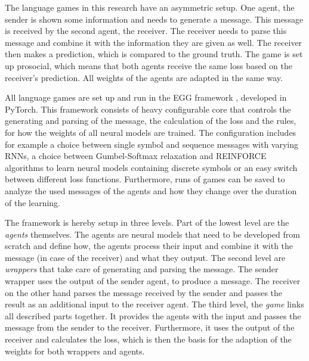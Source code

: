 The language games in this research have an asymmetric setup.
One agent, the sender is shown some information and needs to generate a message.
This message is received by the second agent, the receiver.
The receiver needs to parse this message and combine it with the information they are given as well.
The receiver then makes a prediction, which is compared to the ground truth.
The game is set up prosocial, which means that both agents receive the same loss based on the receiver's prediction.
All weights of the agents are adapted in the same way.

All language games are set up and run in the EGG framework \citep{Kharitonov2019}, developed in PyTorch.
This framework consists of heavy configurable core that controls the generating and parsing of the message, the calculation of the loss and the rules, for how the weights of all neural models are trained.
The configuration includes for example a choice between single symbol and sequence messages with varying RNNs, a choice between Gumbel-Softmax relaxation and REINFORCE algorithms to learn neural models containing discrete symbols or an easy switch between different loss functions.
Furthermore, runs of games can be saved to analyze the used messages of the agents and how they change over the duration of the learning.

The framework is hereby setup in three levels.
Part of the lowest level are the \emph{agents} themselves.
The agents are neural models that need to be developed from scratch and define how, the agents process their input and combine it with the message (in case of the receiver) and what they output.
The second level are \emph{wrappers} that take care of generating and parsing the message.
The sender wrapper uses the output of the sender agent, to produce a message.
The receiver on the other hand parses the message received by the sender and passes the result as an additional input to the receiver agent.
The third level, the \emph{game} links all described parts together.
It provides the agents with the input and passes the message from the sender to the receiver.
Furthermore, it uses the output of the receiver and calculates the loss, which is then the basis for the adaption of the weights for both wrappers and agents.

